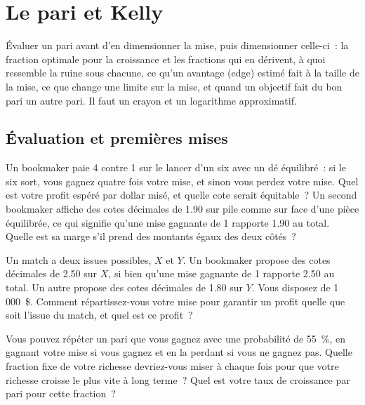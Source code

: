 \chapter{Le pari et Kelly}\label{ch:iv2:betting-and-kelly}

\begin{ivtrains}
Évaluer un pari avant d'en dimensionner la mise, puis dimensionner celle-ci~: la fraction optimale pour la croissance et les fractions qui en dérivent, à quoi ressemble la ruine sous chacune, ce qu'un avantage (edge) estimé fait à la taille de la mise, ce que change une limite sur la mise, et quand un objectif fait du bon pari un autre pari. Il faut un crayon et un logarithme approximatif.
\end{ivtrains}

\section{Évaluation et premières mises}

\begin{question}\label{iq:iv2:betting-and-kelly:1}
Un bookmaker paie 4 contre 1 sur le lancer d'un six avec un dé équilibré~: si le six sort, vous gagnez quatre fois votre mise, et sinon vous perdez votre mise. Quel est votre profit espéré par dollar misé, et quelle cote serait équitable~? Un second bookmaker affiche des cotes décimales de 1.90 sur pile comme sur face d'une pièce équilibrée, ce qui signifie qu'une mise gagnante de 1 rapporte 1.90 au total. Quelle est sa marge s'il prend des montants égaux des deux côtés~?
\end{question}

\begin{question}\label{iq:iv2:betting-and-kelly:2}
Un match a deux issues possibles, $X$ et $Y$. Un bookmaker propose des cotes décimales de 2.50 sur $X$, si bien qu'une mise gagnante de 1 rapporte 2.50 au total. Un autre propose des cotes décimales de 1.80 sur $Y$. Vous disposez de 1\,000~\$. Comment répartissez-vous votre mise pour garantir un profit quelle que soit l'issue du match, et quel est ce profit~?
\end{question}

\begin{question}\label{iq:iv2:betting-and-kelly:3}
Vous pouvez répéter un pari que vous gagnez avec une probabilité de 55~\%, en gagnant votre mise si vous gagnez et en la perdant si vous ne gagnez pas. Quelle fraction fixe de votre richesse devriez-vous miser à chaque fois pour que votre richesse croisse le plus vite à long terme~? Quel est votre taux de croissance par pari pour cette fraction~?
\end{question}

